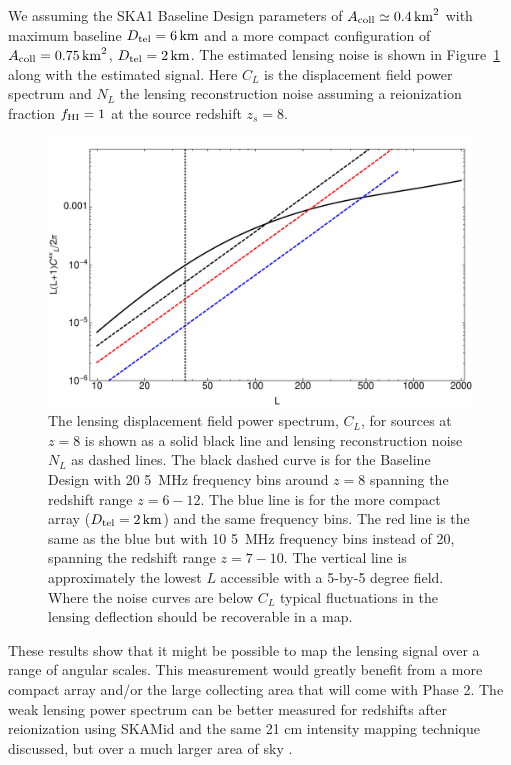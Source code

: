 \documentclass{PoS}
\begin{document}
We assuming the SKA1 Baseline Design \cite{Dewdney:2013} parameters of $A_{\rm coll} \simeq 0.4  \, {\rm km}^2$ with maximum baseline $D_{\rm tel}=6 \, {\rm km}$ and a more compact configuration of  $A_{\rm coll} = 0.75 \, {\rm km}^2$, $D_{\rm tel}=2 \, {\rm km}$. 
The estimated lensing noise is shown in Figure~\ref{fig:CLNL} along with the estimated signal.  
Here $C_L$ is the displacement field power spectrum and $N_L$ the lensing reconstruction noise assuming a reionization fraction $f_{\rm HI}=1$ at the source redshift $z_s=8$.
\begin{figure}[h]
\centerline{
\includegraphics[scale=0.45]{figures/tomographic_SKA_kappaPS.pdf}
}
\caption{The lensing displacement field power spectrum, $C_L$, for sources at $z=8$ is shown as a solid black line and lensing reconstruction noise $N_L$ as dashed lines.  The black dashed curve is for the Baseline Design with 20 5~MHz frequency bins around $z=8$ spanning the redshift range $z=6-12$.   The blue line is for the more compact array ($D_{\rm tel}=2 \, {\rm km}$) and the same frequency bins.  The red line is the same as the blue but with 10 5~MHz frequency bins instead of 20, spanning the redshift range $z = 7-10$.  The vertical line is approximately the lowest $L$ accessible with a 5-by-5 degree field.  Where the noise curves are below $C_L$ typical fluctuations in the lensing deflection should be recoverable in a map. }
\label{fig:CLNL}
\end{figure}

These results show that it might be possible to map the lensing signal over a range of angular scales.  This measurement would greatly benefit from a more compact array and/or the large collecting area that will come with Phase 2.  The weak lensing power spectrum can be better measured for redshifts after reionization using SKA\-Mid and the same 21 cm intensity mapping technique discussed, but over a much larger area of sky \cite{PourtsidouMetcalf:2014}.
\end{document}
